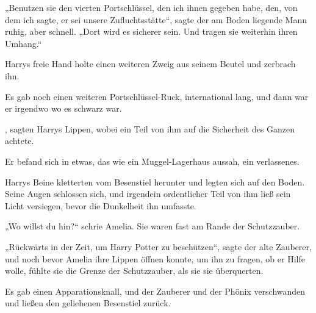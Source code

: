„Benutzen sie den vierten Portschlüssel, den ich ihnen gegeben habe, den, von dem ich sagte, er sei unsere Zufluchtsstätte“, sagte der am Boden liegende Mann ruhig, aber schnell.
„Dort wird es sicherer sein. Und tragen sie weiterhin ihren Umhang.“

Harrys freie Hand holte einen weiteren Zweig aus seinem Beutel und zerbrach ihn.

Es gab noch einen weiteren Portschlüssel-Ruck, international lang, und dann war er irgendwo wo es schwarz war.

, sagten Harrys Lippen, wobei ein Teil von ihm auf die Sicherheit des Ganzen achtete.

Er befand sich in etwas, das wie ein Muggel-Lagerhaus aussah, ein verlassenes.

Harrys Beine kletterten vom Besenstiel herunter und legten sich auf den Boden. Seine Augen schlossen sich, und irgendein ordentlicher Teil von ihm ließ sein Licht versiegen, bevor die Dunkelheit ihn umfasste.

\later

„Wo willst du hin?“ schrie Amelia. Sie waren fast am Rande der Schutzzauber.

„Rückwärts in der Zeit, um Harry Potter zu beschützen“, sagte der alte Zauberer, und noch bevor Amelia ihre Lippen öffnen konnte, um ihn zu fragen, ob er Hilfe wolle, fühlte sie die Grenze der Schutzzauber, als sie sie überquerten.

Es gab einen Apparationsknall, und der Zauberer und der Phönix verschwanden und ließen den geliehenen Besenstiel zurück.

